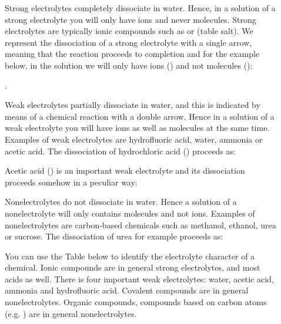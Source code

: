 \documentclass[main.tex]{subfiles} %
\begin{document}
\begin{description}
\item[] Strong electrolytes completely dissociate in water. Hence, in a solution of a strong electrolyte you will only have ions and never molecules. Strong electrolytes are typically ionic compounds such as  or  (table salt). We represent the dissociation of a strong electrolyte with a single arrow, meaning that the reaction proceeds to completion and for the example below, in the solution we will only have ions () and not molecules ():
\begin{center}.\end{center}
\item[] Weak electrolytes partially dissociate in water, and this is indicated by means of a chemical reaction with a double arrow. Hence in a solution of a weak electrolyte you will have ions as well as molecules at the same time. Examples of weak electrolytes are hydrofluoric acid, water, ammonia or acetic acid. The dissociation of hydrochloric acid () proceeds as:
\begin{center}\end{center}
Acetic acid () is an important weak electrolyte and its dissociation proceeds somehow in a peculiar way:
\begin{center}\end{center}

\item[] Nonelectrolytes do not dissociate in water. Hence a solution of a nonelectrolyte will only contains molecules and not ions. Examples of nonelectrolytes are carbon-based chemicals such as methanol, ethanol, urea or sucrose. The dissociation of urea for example  proceeds as:
\begin{center}\end{center}
\item[] You can use the Table below to identify the electrolyte character of a chemical. Ionic compounds are in general strong electrolytes, and most acids as well. There is four important weak electrolytes: water, acetic acid, ammonia and hydrofluoric acid. Covalent compounds are in general nonelectrolytes. Organic compounds, compounds based on carbon atoms (e.g. ) are in general nonelectrolytes.


\end{description}
\end{document}

